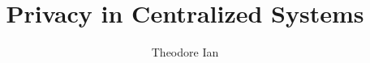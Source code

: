\documentclass[defaultstyle,11pt]{thesis}
\title{Privacy in Centralized Systems}
\author{Theodore Ian}{Martiny}
\begin{document}






\nocite{*}		%

\appendix





\end{document}
